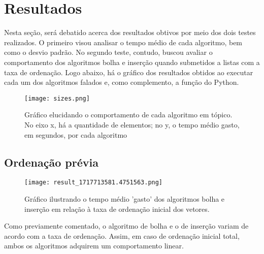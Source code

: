 \section{Resultados}
Nesta seção, será debatido acerca dos resultados obtivos por meio dos dois testes realizados. O primeiro visou analisar o tempo médio de cada algoritmo, bem como o desvio padrão. No segundo teste, contudo, buscou avaliar o comportamento dos algoritmos bolha e inserção quando submetidos a listas com a taxa de ordenação. 
Logo abaixo, há o gráfico dos resultados obtidos ao executar cada um dos algoritmos falados e, como complemento, a função do Python.

\begin{figure}[h]
    \texttt{[image: sizes.png]}
    \caption{Gráfico elucidando o comportamento de cada algoritmo em tópico. No eixo x, há a quantidade de elementos; no y, o tempo médio gasto, em segundos, por cada algoritmo}
    \end{figure}

    \subsection{Ordenação prévia}
    \begin{figure}[h]
        \texttt{[image: result\_1717713581.4751563.png]}
        \caption{Gráfico ilustrando o tempo médio 'gasto' dos algoritmos bolha e inserção em relação à taxa de ordenação inicial dos vetores.}
    \end{figure}

Como  previamente comentado, o algoritmo de bolha e o de inserção variam de acordo com a taxa de ordenação. Assim, em caso de ordenação inicial total, ambos os algoritmos adquirem um comportamento linear.